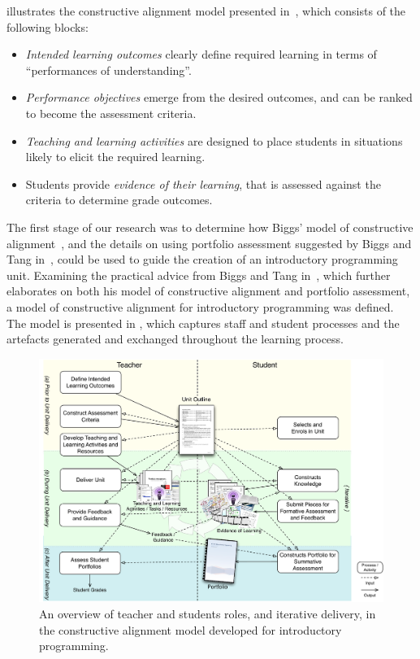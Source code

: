  illustrates the constructive alignment model presented in~\cite{Houghton:2004}, which consists of the following blocks:

\begin{itemize}
	\item \emph{Intended learning outcomes} clearly define required learning in terms of ``performances of understanding''.
	\item \emph{Performance objectives} emerge from the desired outcomes, and can be ranked to become the assessment criteria.
	\item \emph{Teaching and learning activities} are designed to place students in situations likely to elicit the required learning.
	\item Students provide \emph{evidence of their learning}, that is assessed against the criteria to determine grade outcomes.
\end{itemize}


The first stage of our research was to determine how Biggs' model of constructive alignment~\cite{Biggs:1996c}, and the details on using portfolio assessment suggested by Biggs and Tang in~\cite{Biggs:1997}, could be used to guide the creation of an introductory programming unit. Examining the practical advice from Biggs and Tang in~\cite{Biggs:2007}, which further elaborates on both his model of constructive alignment and portfolio assessment, a model of constructive alignment for introductory programming was defined. The model is presented in , which captures staff and student processes and the artefacts generated and exchanged throughout the learning process.

\begin{figure}[t!]
	\centering
	\includegraphics[width=6in]{ProcessOverview}
	\caption{An overview of teacher and students roles, and iterative delivery, in the constructive alignment model developed for introductory programming.}
	\label{fig:process_overview}
\end{figure}

